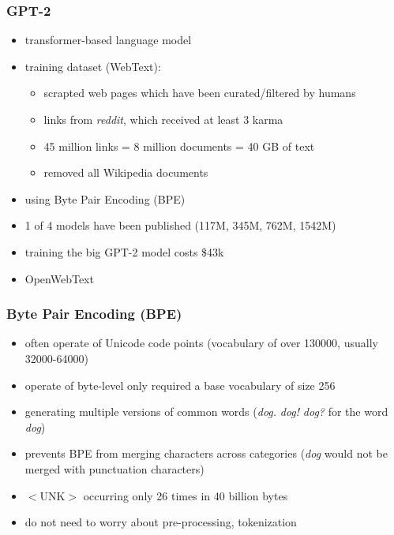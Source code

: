 \documentclass{beamer}
\begin{document}
\begin{frame}
    \frametitle{GPT-2 \cite{gpt2}}
    \begin{itemize}
        \item transformer-based language model
        \item training dataset (WebText):
        \begin{itemize}
			\item scrapted web pages which have been curated/filtered by humans
        	\item links from \textit{reddit}, which received at least 3 karma
        	\item 45 million links = 8 million documents = 40 GB of text
        	\item removed all Wikipedia documents
        \end{itemize}
        \item using Byte Pair Encoding (BPE)
        \item 1 of 4 models have been published (117M, 345M, 762M, 1542M)
        \item training the big GPT-2 model costs \$43k
        \item OpenWebText
    \end{itemize}
\end{frame}

\begin{frame}
    \frametitle{Byte Pair Encoding (BPE)}
    \begin{itemize}
        \item often operate of Unicode code points (vocabulary of over 130000, usually 32000-64000)
        \item operate of byte-level only required a base vocabulary of size 256
        \item generating multiple versions of common words (\textit{dog.} \textit{dog!} \textit{dog?} for the word \textit{dog})
        \item prevents BPE from merging characters across categories (\textit{dog} would not be merged with punctuation characters)
        \item $<$UNK$>$ occurring only 26 times in 40 billion bytes
        \item do not need to worry about pre-processing, tokenization
	\end{itemize}
\end{frame}
\end{document}
